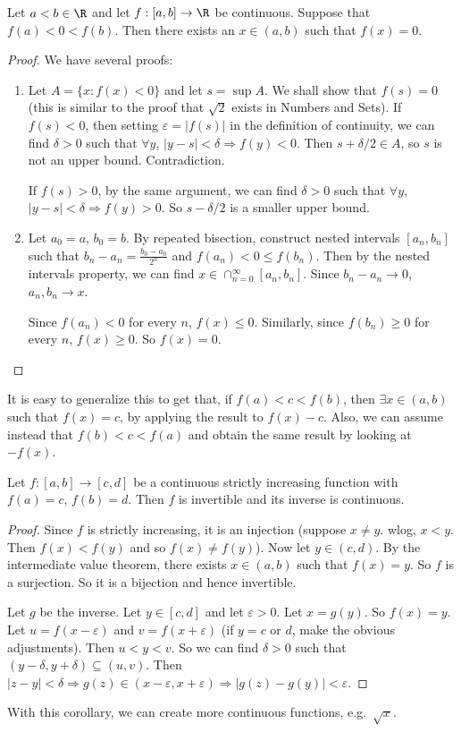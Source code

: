 \documentclass[a4paper]{article}
\begin{document}
\begin{thm}
  Let $a < b\in \R$ and let $f: [a, b] \to \R$ be continuous. Suppose that $f(a) < 0 < f(b)$. Then there exists an $x\in (a, b)$ such that $f(x) = 0$.
\end{thm}

\begin{proof}
  We have several proofs:
  \begin{enumerate}
    \item Let $A = \{x: f(x) < 0\}$ and let $s = \sup A$. We shall show that $f(s) = 0$ (this is similar to the proof that $\sqrt{2}$ exists in Numbers and Sets). If $f(s) < 0$, then setting $\varepsilon = |f(s)|$ in the definition of continuity, we can find $\delta > 0$ such that $\forall y$, $|y - s| < \delta \Rightarrow f(y) < 0$. Then $s + \delta/2 \in A$, so $s$ is not an upper bound. Contradiction.

    If $f(s) > 0$, by the same argument, we can find $\delta > 0$ such that $\forall y$, $|y - s| < \delta \Rightarrow f(y) > 0$. So $s - \delta/2$ is a smaller upper bound.
  \item Let $a_0 = a$, $b_0 = b$. By repeated bisection, construct nested intervals $[a_n, b_n]$ such that $b_n - a_n = \frac{b_0 - a_0}{2^n}$ and $f(a_n) < 0 \leq f(b_n)$. Then by the nested intervals property, we can find $x\in \cap_{n = 0}^\infty [a_n, b_n]$. Since $b_n - a_n \to 0$, $a_n, b_n \to x$.

    Since $f(a_n) < 0$ for every $n$, $f(x) \leq 0$. Similarly, since $f(b_n) \geq 0$ for every $n$, $f(x) \geq 0$. So $f(x) = 0$.\qedhere
  \end{enumerate}
\end{proof}
It is easy to generalize this to get that, if $f(a) < c < f(b)$, then $\exists x\in (a, b)$ such that $f(x) = c$, by applying the result to $f(x) - c$. Also, we can assume instead that $f(b) < c < f(a)$ and obtain the same result by looking at $-f(x)$.

\begin{cor}
  Let $f: [a, b]\to [c, d]$ be a continuous strictly increasing function with $f(a) = c$, $f(b) = d$. Then $f$ is invertible and its inverse is continuous.
\end{cor}

\begin{proof}
  Since $f$ is strictly increasing, it is an injection (suppose $x \not= y$. wlog, $x < y$. Then $f(x) < f(y)$ and so $f(x) \not= f(y)$). Now let $y\in (c, d)$. By the intermediate value theorem, there exists $x\in (a, b)$ such that $f(x) = y$. So $f$ is a surjection. So it is a bijection and hence invertible.

  Let $g$ be the inverse. Let $y\in [c, d]$ and let $\varepsilon > 0$. Let $x = g(y)$. So $f(x) = y$. Let $u = f(x - \varepsilon)$ and $v = f(x + \varepsilon)$ (if $y = c$ or $d$, make the obvious adjustments). Then $u < y < v$. So we can find $\delta > 0$ such that $(y - \delta , y + \delta) \subseteq (u, v)$. Then $|z - y| < \delta \Rightarrow g(z) \in (x - \varepsilon, x + \varepsilon) \Rightarrow |g(z) - g(y)| < \varepsilon$.
\end{proof}
With this corollary, we can create more continuous functions, e.g.\ $\sqrt{x}$.
\end{document}
